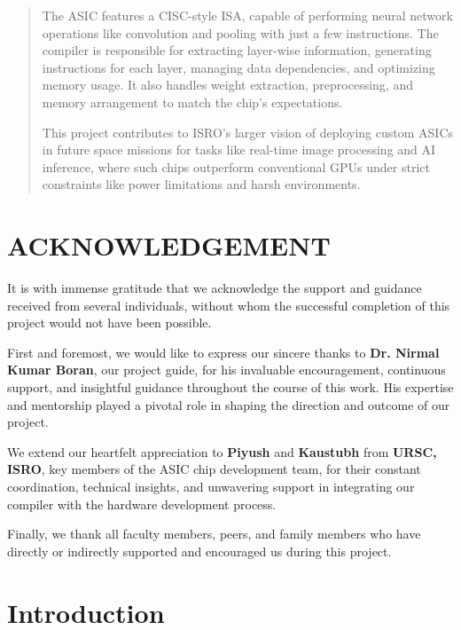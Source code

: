 \documentclass[12pt]{report}
\begin{document}
\begin{spacing}{1.01}
\begin{abstract}
        The ASIC features a CISC-style ISA, capable of performing neural network operations like convolution and pooling with just a few instructions. The compiler is responsible for extracting layer-wise information, generating instructions for each layer, managing data dependencies, and optimizing memory usage. It also handles weight extraction, preprocessing, and memory arrangement to match the chip’s expectations.

        This project contributes to ISRO’s larger vision of deploying custom ASICs in future space missions for tasks like real-time image processing and AI inference, where such chips outperform conventional GPUs under strict constraints like power limitations and harsh environments.

    \end{abstract}
    \chapter*{\rm \large \bf ACKNOWLEDGEMENT}
    It is with immense gratitude that we acknowledge the support and guidance received from several individuals, without whom the successful completion of this project would not have been possible.

    First and foremost, we would like to express our sincere thanks to \textbf{Dr. Nirmal Kumar Boran}, our project guide, for his invaluable encouragement, continuous support, and insightful guidance throughout the course of this work. His expertise and mentorship played a pivotal role in shaping the direction and outcome of our project.

    We extend our heartfelt appreciation to \textbf{Piyush} and \textbf{Kaustubh} from \textbf{URSC, ISRO}, key members of the ASIC chip development team, for their constant coordination, technical insights, and unwavering support in integrating our compiler with the hardware development process.

    Finally, we thank all faculty members, peers, and family members who have directly or indirectly supported and encouraged us during this project.
    \vspace{4.0mm}
    \tableofcontents
\end{spacing}
\listoffigures
\vspace{-2 em}
\printglossary[nonumberlist]



\chapter{Introduction}
\end{document}
